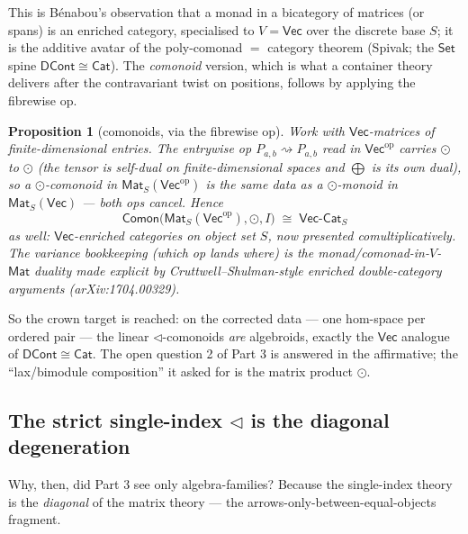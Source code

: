 \documentclass[11pt]{amsart}
\theoremstyle{plain}
\newtheorem{proposition}[theorem]{Proposition}
\theoremstyle{definition}
\renewcommand{\Vec}{\mathsf{Vec}}
\newcommand{\Set}{\mathsf{Set}}
\newcommand{\Cat}{\mathsf{Cat}}
\newcommand{\Comon}{\mathsf{Comon}}
\newcommand{\Mat}{\mathsf{Mat}}
\newcommand{\VCat}{\Vec\text{-}\mathsf{Cat}}
\newcommand{\op}{\mathrm{op}}
\newcommand{\iso}{\cong}
\begin{document}
This is B\'enabou's observation that a monad in a bicategory of matrices (or spans)
is an enriched category, specialised to $V=\Vec$ over the discrete base $S$; it is
the additive avatar of the poly-comonad $=$ category theorem
(Spivak; the $\Set$ spine $\mathsf{DCont}\iso\Cat$). The \emph{comonoid} version,
which is what a container theory delivers after the contravariant twist on
positions, follows by applying the fibrewise op.

\begin{proposition}[comonoids, via the fibrewise op]\label{prop:algebroid-comon}
Work with $\Vec$-matrices of finite-dimensional entries. The entrywise op
$P_{a,b}\rightsquigarrow P_{a,b}$ read in $\Vec^\op$ carries $\odot$ to $\odot$ (the
tensor is self-dual on finite-dimensional spaces and $\bigoplus$ is its own dual),
so a $\odot$-comonoid in $\Mat_S(\Vec^\op)$ is the same data as a $\odot$-monoid in
$\Mat_S(\Vec)$ --- both ops cancel. Hence
\[
  \Comon\bigl(\Mat_S(\Vec^\op),\odot,I\bigr)\;\iso\;\VCat_S
\]
as well: $\Vec$-enriched categories on object set $S$, now presented
comultiplicatively. The variance bookkeeping (which op lands where) is the
monad/comonad-in-$V$-$\Mat$ duality made explicit by Cruttwell--Shulman-style
enriched double-category arguments (arXiv:1704.00329).
\end{proposition}

So the crown target is reached: on the corrected data --- one hom-space per ordered
pair --- the linear $\lhd$-comonoids \emph{are} algebroids, exactly the $\Vec$
analogue of $\mathsf{DCont}\iso\Cat$. The open question 2 of Part 3 is answered in
the affirmative; the ``lax/bimodule composition'' it asked for is the matrix product
$\odot$.

\subsection{The strict single-index $\lhd$ is the diagonal degeneration}

Why, then, did Part 3 see only algebra-families? Because the single-index theory is
the \emph{diagonal} of the matrix theory --- the arrows-only-between-equal-objects
fragment.
\end{document}
